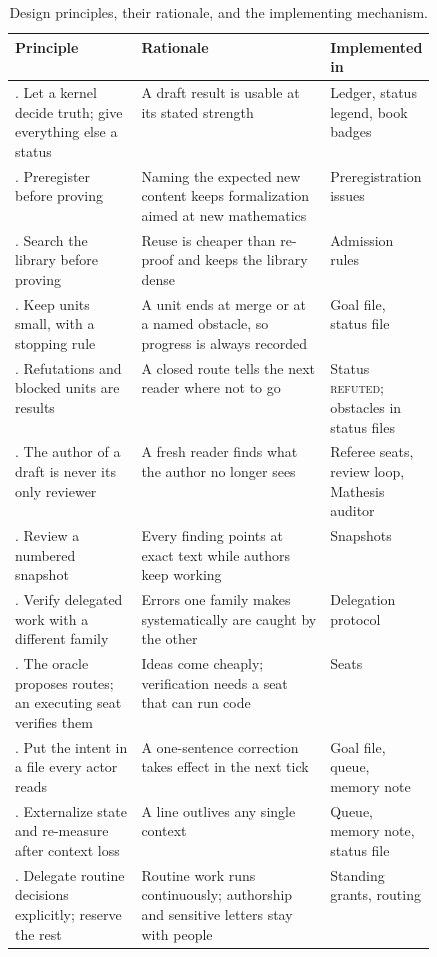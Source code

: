 \documentclass[11pt]{article}
\begin{document}
\begin{table}[htbp]
\centering\scriptsize
\caption{Design principles, their rationale, and the implementing mechanism.}
\label{tab:principles}
\begin{tabularx}{\linewidth}{@{}>{\raggedright\arraybackslash}p{0.3\linewidth}>{\raggedright\arraybackslash}X>{\raggedright\arraybackslash}p{0.19\linewidth}@{}}
\toprule
Principle & Rationale & Implemented in \\
\midrule
1. Let a kernel decide truth; give everything else a status & A draft result is usable at its stated strength & Ledger, status legend, book badges \\
2. Preregister before proving & Naming the expected new content keeps formalization aimed at new mathematics & Preregistration issues \\
3. Search the library before proving & Reuse is cheaper than re-proof and keeps the library dense & Admission rules \\
4. Keep units small, with a stopping rule & A unit ends at merge or at a named obstacle, so progress is always recorded & Goal file, status file \\
5. Refutations and blocked units are results & A closed route tells the next reader where not to go & Status \textsc{refuted}; obstacles in status files \\
6. The author of a draft is never its only reviewer & A fresh reader finds what the author no longer sees & Referee seats, review loop, Mathesis auditor \\
7. Review a numbered snapshot & Every finding points at exact text while authors keep working & Snapshots \\
8. Verify delegated work with a different family & Errors one family makes systematically are caught by the other & Delegation protocol \\
9. The oracle proposes routes; an executing seat verifies them & Ideas come cheaply; verification needs a seat that can run code & Seats \\
10. Put the intent in a file every actor reads & A one-sentence correction takes effect in the next tick & Goal file, queue, memory note \\
11. Externalize state and re-measure after context loss & A line outlives any single context & Queue, memory note, status file \\
12. Delegate routine decisions explicitly; reserve the rest & Routine work runs continuously; authorship and sensitive letters stay with people & Standing grants, routing \\

\end{tabularx}
\end{table}
\end{document}
